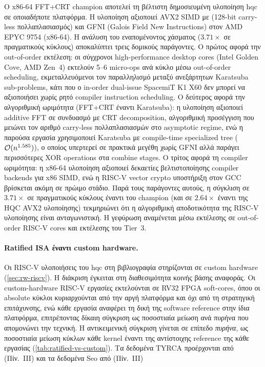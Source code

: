 Ο x86-64 FFT+CRT champion \cite{Chen2026-TCHES-HQC-FFT} αποτελεί τη βέλτιστη
δημοσιευμένη υλοποίηση \gls{hqc} σε οποιαδήποτε πλατφόρμα. Η υλοποίηση
αξιοποιεί AVX2 SIMD με  (128-bit carry-less πολλαπλασιασμός) και
GFNI (Galois Field New Instructions) στον AMD EPYC 9754 (x86-64).
Η ανάλυση του εναπομένοντος χάσματος ($3.71\times$ σε πραγματικούς 
κύκλους) αποκαλύπτει τρεις δομικούς παράγοντες. Ο πρώτος αφορά
 την out-of-order εκτέλεση: οι σύγχρονοι high-performance desktop 
 cores (Intel Golden Cove, AMD Zen~4) εκτελούν 5–6 micro-ops ανά 
 κύκλο μέσω out-of-order scheduling, εκμεταλλευόμενοι τον παραλληλισμό 
 μεταξύ ανεξάρτητων Karatsuba sub-problems, κάτι που ο in-order 
 dual-issue SpacemiT K1 X60 δεν μπορεί να αξιοποιήσει χωρίς ρητό 
 compiler instruction scheduling. Ο δεύτερος αφορά την αλγοριθμική 
 ωριμότητα (FFT+CRT έναντι Karatsuba): η υλοποίηση 
 αξιοποιεί additive FFT σε συνδυασμό με 
 CRT decomposition, αλγοριθμική προσέγγιση που μειώνει τον αριθμό 
 carry-less πολλαπλασιασμών στο asymptotic regime, ενώ η παρούσα 
 εργασία χρησιμοποιεί Karatsuba με compile-time specialized tree 
 ($\mathcal{O}(n^{1.585})$), ο οποίος υπερτερεί σε πρακτικά μεγέθη χωρίς 
 GFNI αλλά παράγει περισσότερες XOR operations στα combine stages. 
 Ο τρίτος αφορά τη compiler ωριμότητα: η x86-64 υλοποίηση αξιοποιεί 
 δεκαετίες βελτιστοποίησης compiler backends για x86 SIMD, ενώ η 
 RISC-V vector crypto υποστήριξη στον GCC βρίσκεται ακόμη σε πρώιμο 
 στάδιο. Παρά τους παράγοντες αυτούς, η σύγκλιση σε $3.71\times$ σε 
 πραγματικούς κύκλους έναντι του champion (και σε $2.64\times$ έναντι 
 της HQC AVX2 υλοποίησης) τεκμηριώνει ότι η αλγοριθμική αποδοτικότητα 
 της RISC-V υλοποίησης είναι ανταγωνιστική. Η γεφύρωση αναμένεται μέσω 
 εκτέλεσης σε out-of-order RISC-V cores και εκτέλεσης του Tier~3.

\paragraph{Ratified ISA έναντι custom hardware.}
\label{ssec:ratified-vs-custom}

Οι RISC-V υλοποιήσεις του \gls{hqc} στη βιβλιογραφία στηρίζονται σε custom
hardware (\cref{sec:rw-riscv}). Η διάκριση έγκειται στη διαθεσιμότητα 
κοινής βάσης αναφοράς. Οι custom-hardware RISC-V εργασίες εκτελούνται 
σε RV32 FPGA soft-cores, όπου οι absolute κύκλοι κυριαρχούνται από την 
αργή πλατφόρμα και όχι από τη στρατηγική επιτάχυνσης, ενώ κάθε εργασία 
αναφέρει τη δική της software reference στην ίδια πλατφόρμα, 
επιτρέποντας δίκαιη σύγκριση ως ποσοστιαία μείωση ανά πυρήνα που 
απομονώνει την τεχνική. Η
αντικειμενική σύγκριση γίνεται σε επίπεδο \emph{πυρήνα}, ως ποσοστιαία μείωση
κύκλων κάθε kernel έναντι της αντίστοιχης reference της κάθε εργασίας
(\cref{tab:ratified-vs-custom}). Τα δεδομένα TYRCA προέρχονται 
από \cite{Dolmeta2025-TYRCA} (Πίν.~III) και τα δεδομένα Seo από \cite{Seo2026-HQC-Ibex} (Πίν.~III)


